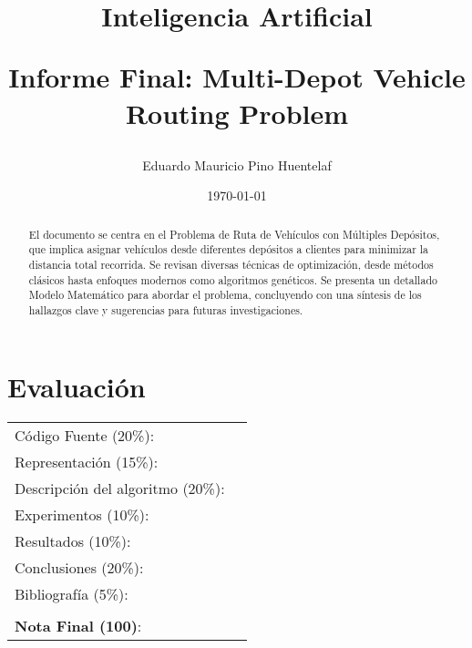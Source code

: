 \documentclass[letter, 10pt]{article}
\begin{document}
\title{Inteligencia Artificial \\ \begin{Large}Informe Final: Multi-Depot Vehicle Routing Problem\end{Large}}
\author{Eduardo Mauricio Pino Huentelaf}
\date{\today}
\maketitle


\section*{Evaluación}

\begin{tabular}{ll}
C\'odigo Fuente (20\%): &  \underline{\hspace{2cm}}\\
Representaci\'on (15\%):  & \underline{\hspace{2cm}} \\
Descripci\'on del algoritmo (20\%):  & \underline{\hspace{2cm}} \\
Experimentos (10\%):  & \underline{\hspace{2cm}} \\
Resultados (10\%):  & \underline{\hspace{2cm}} \\
Conclusiones (20\%): &  \underline{\hspace{2cm}}\\
Bibliograf\'ia (5\%): & \underline{\hspace{2cm}}\\
 &  \\
\textbf{Nota Final (100)}:   & \underline{\hspace{2cm}}
\end{tabular}

\begin{abstract}
El documento se centra en el Problema de Ruta de Vehículos con Múltiples Depósitos, que implica asignar vehículos desde diferentes depósitos a clientes para minimizar la distancia total recorrida. Se revisan diversas técnicas de optimización, desde métodos clásicos hasta enfoques modernos como algoritmos genéticos. Se presenta un detallado Modelo Matemático para abordar el problema, concluyendo con una síntesis de los hallazgos clave y sugerencias para futuras investigaciones.
\end{abstract}
\end{document}
